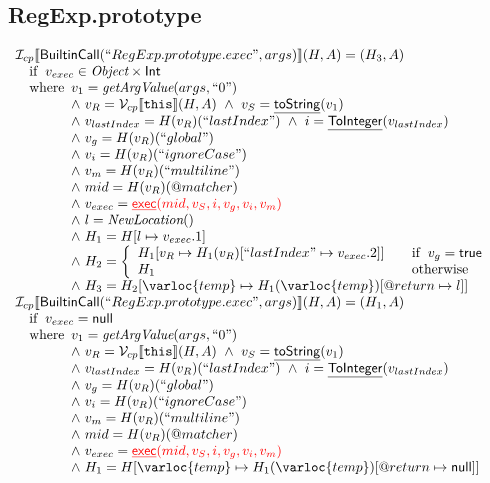 \subsection{RegExp.prototype}
\[
\begin{array}{l}
\I_{cp}\lbr \SF{BuiltinCall}(``RegExp.prototype.exec", args)\rbr(H,A)
= (H_3, A)\\
\quad\ifc{
  v_{exec} \in \Obj \times \SF{Int}
}\\
\quad\wherec{
   v_{1} = \hf{getArgValue}(args, ``0")\\
   \land~ v_R = \V _{cp}\lbr \TT{this}\rbr (H,A)
   ~\land~ v_S = \chf{toString}(v_1)\\
   \land~ v_{lastIndex} = H(v_R)(``lastIndex") ~\land~ i = \chf{ToInteger}(v_{lastIndex}) \\
   \land~ v_{g} = H(v_R)(``global")\\
   \land~ v_{i} = H(v_R)(``ignoreCase")\\
   \land~ v_{m} = H(v_R)(``multiline")\\
   \land~ mid = H(v_R)(\varprop{matcher})\\
   \land~ v_{exec} = {\inred \chf{exec}(mid, v_S, i, v_{g}, v_{i}, v_{m})}\\
   \land~ l=\hf{NewLocation}()\\
   \land~ H_1 = H[l\mapsto v_{exec}.1]\\
   \land~ H_2 = \left\{
     \begin{array}{ll}
       H_1[v_R\mapsto H_1(v_R)[``lastIndex"\mapsto v_{exec}.2]] & \quad\ifc{v_g = \SF{true}}\\
       H_1 & \quad\owc \\
     \end{array}
   \right.\\
   \land~ H_3 = H_2[\varloc{temp}\mapsto H_1(\varloc{temp})[\varprop{return}\mapsto l]]
}\\
\I_{cp}\lbr \SF{BuiltinCall}(``RegExp.prototype.exec", args)\rbr(H,A)
= (H_1, A)\\
\quad\ifc{
  v_{exec} = \SF{null}
}\\
\quad\wherec{
   v_{1} = \hf{getArgValue}(args, ``0")\\
   \land~ v_R = \V _{cp}\lbr \TT{this}\rbr (H,A)
   ~\land~ v_S = \chf{toString}(v_1)\\
   \land~ v_{lastIndex} = H(v_R)(``lastIndex") ~\land~ i = \chf{ToInteger}(v_{lastIndex}) \\
   \land~ v_{g} = H(v_R)(``global")\\
   \land~ v_{i} = H(v_R)(``ignoreCase")\\
   \land~ v_{m} = H(v_R)(``multiline")\\
   \land~ mid = H(v_R)(\varprop{matcher})\\
   \land~ v_{exec} = {\inred\chf{exec}(mid, v_S, i, v_{g}, v_{i}, v_{m})}\\
   \land~ H_1 = H[\varloc{temp}\mapsto H_1(\varloc{temp})[\varprop{return}\mapsto \SF{null}]]
}\\\\


\end{array}\]
